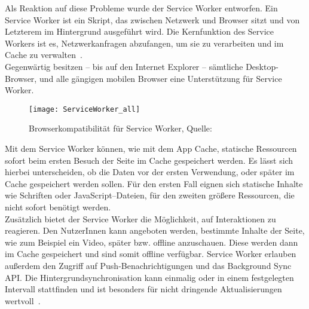 Als Reaktion auf diese Probleme wurde der Service Worker entworfen.
%
%
Ein Service Worker ist ein Skript, das zwischen Netzwerk und Browser sitzt und von Letzterem im Hintergrund ausgeführt wird. Die Kernfunktion des Service Workers ist es, Netzwerkanfragen abzufangen, um sie zu verarbeiten und im Cache zu verwalten~\cite{serviceworker}.\\
Gegenwärtig besitzen -- bis auf den Internet Explorer -- sämtliche Desktop-Browser, und alle gängigen mobilen Browser eine Unterstützung für Service Worker.
%
\begin{figure}[H]
	\centering
	\texttt{[image: ServiceWorker\_all]}
	\grayRule
	\caption[Browserkompatibilität für Service Worker]{Browserkompatibilität für Service Worker, Quelle: ~\cite{caniuse-sw}}
	\label{fig:serviceworker}
\end{figure}
%
Mit dem Service Worker können, wie mit dem App Cache, statische Ressourcen sofort beim ersten Besuch der Seite im Cache gespeichert werden. Es lässt sich hierbei unterscheiden, ob die Daten vor der ersten Verwendung, oder später im Cache gespeichert werden sollen. Für den ersten Fall eignen sich statische Inhalte wie Schriften oder JavaScript--Dateien, für den zweiten größere Ressourcen, die nicht sofort benötigt werden.\\
Zusätzlich bietet der Service Worker die Möglichkeit, auf Interaktionen zu reagieren. Den NutzerInnen kann angeboten werden, bestimmte Inhalte der Seite, wie zum Beispiel ein Video, später bzw. offline anzuschauen. Diese werden dann im Cache gespeichert und sind somit offline verfügbar.
Service Worker erlauben außerdem den Zugriff auf Push-Benachrichtigungen und das Background Sync \gls{API}.
Die Hintergrundsynchronisation kann einmalig oder in einem festgelegten Intervall stattfinden und ist besonders für nicht dringende Aktualisierungen wertvoll~\cite{offline_cookbook}.
